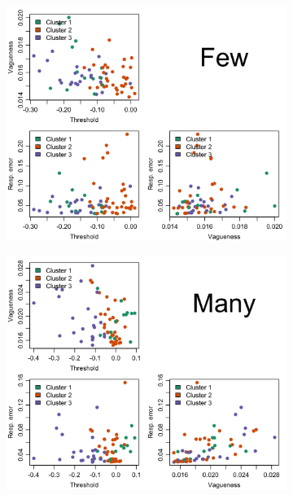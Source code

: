 \documentclass{article}
\begin{document}
\iffalse
\begin{figure} [H]
 \centering
     \begin{subfigure}[b]{0.99\textwidth}
     \centering
     \includegraphics[width=\textwidth]{Figure2.5a.png}
     \caption{\label{fig:fig2.5a}}
    \vspace{4ex}
    \end{subfigure}
    
    \begin{subfigure}[b]{0.99\textwidth}
    \centering
     \includegraphics[width=\linewidth]{Figure2.5b.png}
     \caption{\label{fig:fig2.5b}}
    \vspace{4ex}
    \end{subfigure}
\end{figure}
\end{document}
